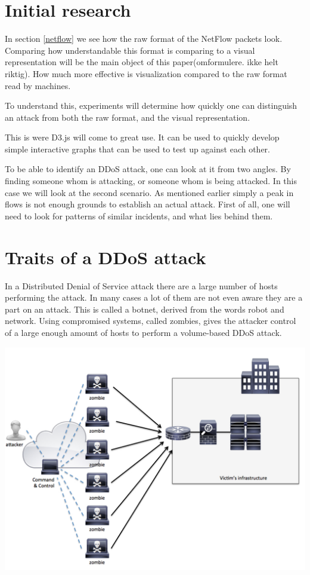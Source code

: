 \section{Initial research}
In section \ref{netflow} we see how the raw format of the NetFlow packets look. Comparing how understandable this format is comparing to a visual representation will be the main object of this paper(omformulere. ikke helt riktig). How much more effective is visualization compared to the raw format read by machines. 

To understand this, experiments will determine how quickly one can distinguish an attack from both the raw format, and the visual representation. 

This is were D3.js will come to great use. It can be used to quickly develop simple interactive graphs that can be used to test up against each other.

To be able to identify an DDoS attack, one can look at it from two angles. By finding someone whom is attacking, or someone whom is being attacked. In this case we will look at the second scenario. As mentioned earlier simply a peak in flows is not enough grounds to establish an actual attack. First of all, one will need to look for patterns of similar incidents, and what lies behind them.

\newpage

\section{Traits of a DDoS attack}
In a Distributed Denial of Service attack there are a large number of hosts performing the attack. In many cases a lot of them are not even aware they are a part on an attack. This is called a botnet, derived from the words robot and network. Using compromised systems, called zombies, gives the attacker control of a large enough amount of hosts to perform a volume-based DDoS attack. 

\includegraphics[scale=0.2]{botnet}

